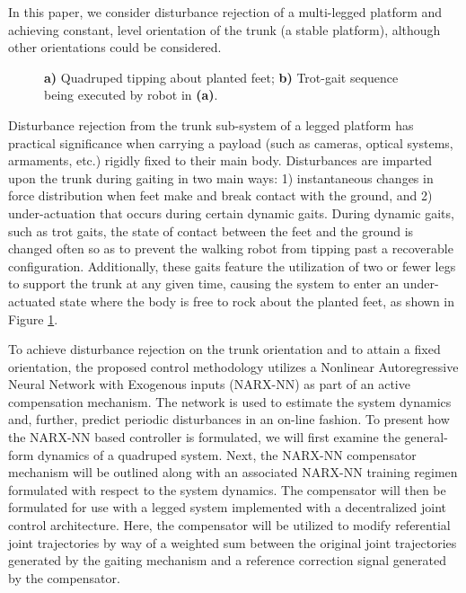 In this paper, we consider disturbance rejection of a multi-legged platform and achieving constant, level orientation of the trunk (\IE a stable platform), although other orientations could be considered. 
	\begin{figure}[b!]
	\centering
		\begin{subfigure}{0.475\textwidth}
			\centering
			\caption{ }
		\end{subfigure}
		\begin{subfigure}{0.475\textwidth}
			\centering
			\caption{ }
		\end{subfigure}
		\caption{ \textbf{a)} Quadruped tipping about planted feet; \textbf{b)} Trot-gait sequence being executed by robot in \textbf{(a)}.}
		\label{fig::quadruped_walking}
	\end{figure}
Disturbance rejection from the trunk sub-system of a legged platform has practical significance when carrying a payload (such as cameras, optical systems, armaments, etc.) rigidly fixed to their main body. Disturbances are imparted upon the trunk during gaiting in two main ways: 1) instantaneous changes in force distribution when feet make and break contact with the ground, and 2) under-actuation that occurs during certain dynamic gaits. During dynamic gaits, such as trot gaits, the state of contact between the feet and the ground is changed often so as to prevent the walking robot from tipping past a recoverable configuration. Additionally, these gaits feature the utilization of two or fewer legs to support the trunk at any given time, causing the system to enter an under-actuated state where the body is free to rock about the planted feet, as shown in Figure \ref{fig::quadruped_walking}.

To achieve disturbance rejection on the trunk orientation and to attain a fixed orientation, the proposed control methodology utilizes a Nonlinear Autoregressive Neural Network with Exogenous inputs (NARX-NN) as part of an active compensation mechanism. The network is used to estimate the system dynamics and, further, predict periodic disturbances in an on-line fashion. To present how the NARX-NN based controller is formulated, we will first examine the general-form dynamics of a quadruped system. Next, the NARX-NN compensator mechanism will be outlined along with an associated NARX-NN training regimen formulated with respect to the system dynamics. The compensator will then be formulated for use with a legged system implemented with a decentralized joint control architecture. Here, the compensator will be utilized to modify referential joint trajectories by way of a weighted sum between the original joint trajectories generated by the gaiting mechanism and a reference correction signal generated by the compensator.

